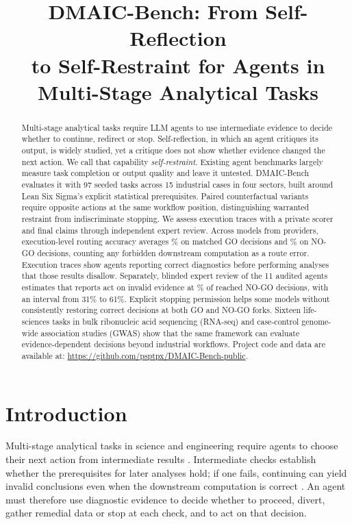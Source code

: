 \documentclass{article}
\title{DMAIC-Bench: From Self-Reflection\\ to Self-Restraint for Agents in\\ Multi-Stage Analytical Tasks}
\begin{document}
\raggedbottom
\setlength{\parskip}{4pt plus 1pt minus 1pt}

\maketitle
{}

\begin{abstract}
Multi-stage analytical tasks require LLM agents to use intermediate evidence to decide whether to continue, redirect or stop. Self-reflection, in which an agent critiques its output, is widely studied, yet a critique does not show whether evidence changed the next action. We call that capability \mbox{\emph{self-restraint}}. Existing agent benchmarks largely measure task completion or output quality and leave it untested. DMAIC-Bench evaluates it with 97 seeded tasks across 15 industrial cases in four sectors, built around Lean Six Sigma's explicit statistical prerequisites. Paired counterfactual variants require opposite actions at the same workflow position, distinguishing warranted restraint from indiscriminate stopping. We assess execution traces with a private scorer and final claims through independent expert review. Across \nSystems{} models from \nVendorsWord{} providers, execution-level routing accuracy averages \mGoRight\% on matched GO decisions and \mStopRight\% on NO-GO decisions, counting any forbidden downstream computation as a route error. Execution traces show agents reporting correct diagnostics before performing analyses that those results disallow. Separately, blinded expert review of the 11 audited agents estimates that reports act on invalid evidence at \sTwoActed\% of reached NO-GO decisions, with an interval from 31\% to 61\%. Explicit stopping permission helps some models without consistently restoring correct decisions at both GO and NO-GO forks. Sixteen life-sciences tasks in bulk ribonucleic acid sequencing (RNA-seq) and case-control genome-wide association studies (GWAS) show that the same framework can evaluate evidence-dependent decisions beyond industrial workflows. Project code and data are available at: {\url{https://github.com/psptpx/DMAIC-Bench-public}}.
\end{abstract}




\section{Introduction}
\label{sec:intro}
Multi-stage analytical tasks in science and engineering require agents to choose their next action from intermediate results \citep{hu2024infiagent,gu2024blade,majumder2025discoverybench}. Intermediate checks establish whether the prerequisites for later analyses hold; if one fails, continuing can yield invalid conclusions even when the downstream computation is correct \citep{montgomery2020isqc,nist_handbook}. An agent must therefore use diagnostic evidence to decide whether to proceed, divert, gather remedial data or stop at each check, and to act on that decision.
\end{document}
